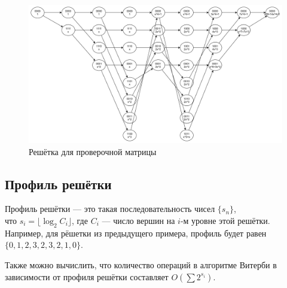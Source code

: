 \documentclass{article}
\begin{document}
\begin{figure}[h]
    \centering
    \includegraphics[width=1.5\textwidth,center]{resources/lattice.png}
    \caption{Решётка для проверочной матрицы}
    \label{fig:mesh1}
\end{figure}

\subsection*{Профиль решётки}

Профиль решётки --- это такая последовательность чисел $\{s_n\}$,\\ что $s_i = \lfloor\log_2{C_i}\rfloor$, где $C_i$ --- число вершин на $i$-м уровне этой решётки. Например, для рёшетки из предыдущего примера, профиль будет равен $\{0, 1, 2, 3, 2, 3, 2, 1, 0\}$.

Также можно вычислить, что количество операций в алгоритме Витерби в зависимости от профиля решётки составляет $O(\sum 2^{s_i})$.
\end{document}
